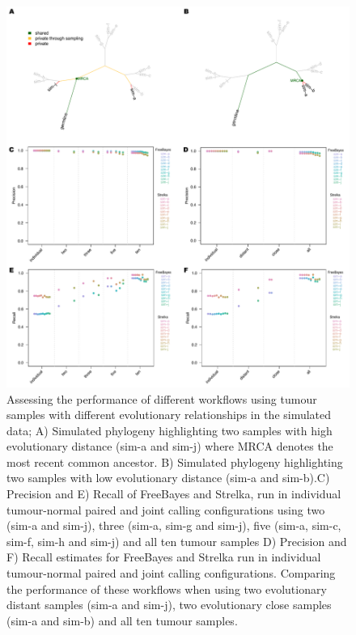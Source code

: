 \begin{figure}[tbp]
\centering
  \includegraphics[width=\textwidth]{Appendices/Variantcalling/supp/S6}
  \caption[Assessing the performance of different workflows using tumour samples with different evolutionary relationships in the simulated data]{Assessing the performance of different workflows using tumour samples with different evolutionary relationships in the simulated data; A) Simulated phylogeny highlighting two samples with high evolutionary distance (sim-a and sim-j) where MRCA denotes the most recent common ancestor. B) Simulated phylogeny highlighting two samples with low evolutionary distance (sim-a and sim-b).C) Precision  and E) Recall of FreeBayes and Strelka, run in individual tumour-normal paired and joint calling configurations using two (sim-a and sim-j), three (sim-a, sim-g and sim-j), five (sim-a, sim-c, sim-f, sim-h and sim-j) and all ten tumour samples D) Precision and F) Recall estimates for FreeBayes and Strelka run in individual tumour-normal paired and joint calling configurations. Comparing the performance of these workflows when using two evolutionary distant samples (sim-a and sim-j), two evolutionary close samples (sim-a and sim-b) and all ten tumour samples.}\label{A:fig:S06}
\end{figure}


